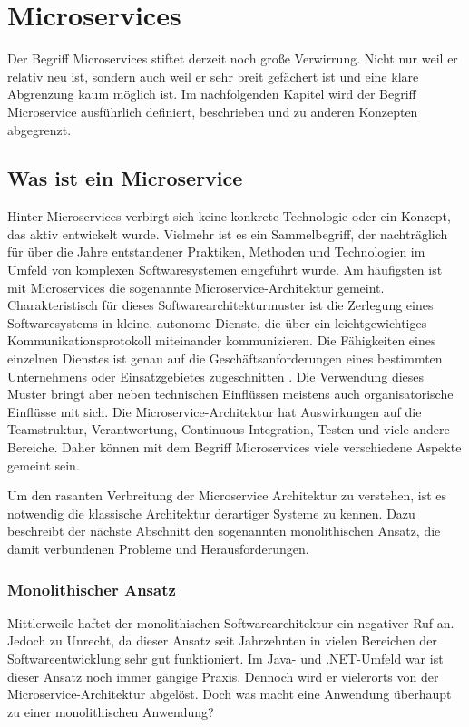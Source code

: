 \chapter{Microservices}

Der Begriff Microservices stiftet derzeit noch große Verwirrung. Nicht nur weil er relativ neu ist, sondern auch weil er sehr breit gefächert ist und eine klare Abgrenzung kaum möglich ist. Im nachfolgenden Kapitel wird der Begriff Microservice ausführlich definiert, beschrieben und zu anderen Konzepten abgegrenzt.

\section{Was ist ein Microservice}

Hinter Microservices verbirgt sich keine konkrete Technologie oder ein Konzept, das aktiv entwickelt wurde. Vielmehr ist es ein Sammelbegriff, der nachträglich für über die Jahre entstandener Praktiken, Methoden und Technologien im Umfeld von komplexen Softwaresystemen eingeführt wurde. Am häufigsten ist mit Microservices die sogenannte Microservice-Architektur gemeint. Charakteristisch für dieses Softwarearchitekturmuster ist die Zerlegung eines Softwaresystems in kleine, autonome Dienste, die über ein leichtgewichtiges Kommunikationsprotokoll miteinander kommunizieren. Die Fähigkeiten eines einzelnen Dienstes ist genau auf die Geschäftsanforderungen eines bestimmten Unternehmens oder Einsatzgebietes zugeschnitten \cite{FowlerMS}. Die Verwendung dieses Muster bringt aber neben technischen Einflüssen meistens auch organisatorische Einflüsse mit sich. Die Microservice-Architektur hat Auswirkungen auf die Teamstruktur, Verantwortung, Continuous Integration, Testen und viele andere Bereiche. Daher können mit dem Begriff Microservices viele verschiedene Aspekte gemeint sein.

Um den rasanten Verbreitung der Microservice Architektur zu verstehen, ist es notwendig die klassische Architektur derartiger Systeme zu kennen. Dazu beschreibt der nächste Abschnitt den sogenannten monolithischen Ansatz, die damit verbundenen Probleme und Herausforderungen.

\subsection{Monolithischer Ansatz}

Mittlerweile haftet der monolithischen Softwarearchitektur ein negativer Ruf an. Jedoch zu Unrecht, da dieser Ansatz seit Jahrzehnten  in vielen Bereichen der Softwareentwicklung sehr gut funktioniert. Im Java- und .NET-Umfeld war \bzw ist dieser Ansatz noch immer gängige Praxis. Dennoch wird er vielerorts von der Microservice-Architektur abgelöst. Doch was macht eine Anwendung überhaupt zu einer monolithischen Anwendung?

